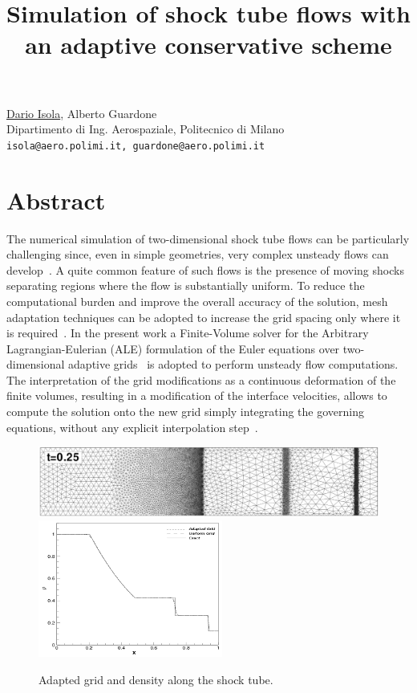 \title{Simulation of shock tube flows with an adaptive conservative scheme}
\author{} \institute{}
\maketitle

\begin{center}
{\large \underline{Dario Isola}, Alberto Guardone}\\
Dipartimento di Ing. Aerospaziale, Politecnico di Milano\\
{\tt isola@aero.polimi.it, guardone@aero.polimi.it}
\end{center}

\section*{Abstract}
The numerical simulation of two-dimensional shock tube flows can be particularly challenging since, even in simple geometries, very complex unsteady flows can develop~\cite{Woodward-Colella-1984}. A quite common feature of such flows is the presence of moving shocks separating regions where the flow is substantially uniform. To reduce the computational burden and improve the overall accuracy of the solution, mesh adaptation techniques can be adopted to increase the grid spacing only where it is required~\cite{Naderi-Darbandi-Rahni-2010}.  In the present work a Finite-Volume solver for the Arbitrary Lagrangian-Eulerian (ALE) formulation of the Euler equations over two-dimensional adaptive grids~\cite{Forestieri-Isola-Marulli-Guardone-Quaranta-2010} is adopted to perform unsteady flow computations. The interpretation of the grid modifications as a continuous deformation of the finite volumes, resulting in a modification of the interface velocities, allows to compute the solution onto the new grid simply integrating the governing equations, without any explicit interpolation step~\cite{Isola-Guardone-Quaranta-2010}.

\begin{figure}
\centering
\includegraphics[height=.16\textwidth]{./isola/grid.png}
\includegraphics[height=.16\textwidth]{./isola/solution.png}
\caption{Adapted grid and density along the shock tube.}
\end{figure}

